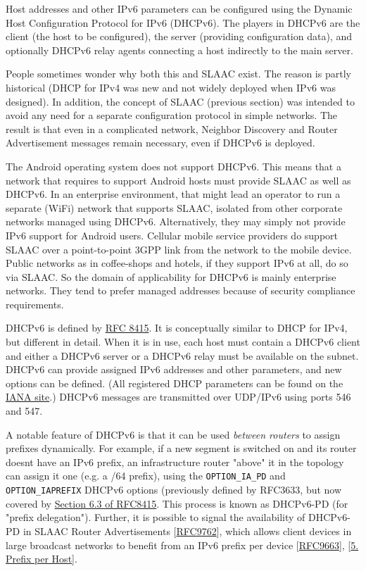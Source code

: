 \documentclass[
]{article}
\begin{document}
Host addresses and other IPv6 parameters can be configured using the
Dynamic Host Configuration Protocol for IPv6 (DHCPv6). The players in
DHCPv6 are the client (the host to be configured), the server (providing
configuration data), and optionally DHCPv6 relay agents connecting a
host indirectly to the main server.

People sometimes wonder why both this and SLAAC exist. The reason is
partly historical (DHCP for IPv4 was new and not widely deployed when
IPv6 was designed). In addition, the concept of SLAAC (previous section)
was intended to avoid any need for a separate configuration protocol in
simple networks. The result is that even in a complicated network,
Neighbor Discovery and Router Advertisement messages remain necessary,
even if DHCPv6 is deployed.

The Android operating system does not support DHCPv6. This means that a
network that requires to support Android hosts must provide SLAAC as
well as DHCPv6. In an enterprise environment, that might lead an
operator to run a separate (WiFi) network that supports SLAAC, isolated
from other corporate networks managed using DHCPv6. Alternatively, they
may simply not provide IPv6 support for Android users. Cellular mobile
service providers do support SLAAC over a point-to-point 3GPP link from
the network to the mobile device. Public networks as in coffee-shops and
hotels, if they support IPv6 at all, do so via SLAAC. So the domain of
applicability for DHCPv6 is mainly enterprise networks. They tend to
prefer managed addresses because of security compliance requirements.

DHCPv6 is defined by \href{https://www.rfc-editor.org/info/rfc8415}{RFC
8415}. It is conceptually similar to DHCP for IPv4, but different in
detail. When it is in use, each host must contain a DHCPv6 client and
either a DHCPv6 server or a DHCPv6 relay must be available on the
subnet. DHCPv6 can provide assigned IPv6 addresses and other parameters,
and new options can be defined. (All registered DHCP parameters can be
found on the
\href{https://www.iana.org/assignments/dhcpv6-parameters/dhcpv6-parameters.xhtml\#dhcpv6-parameters-2}{IANA
site}.) DHCPv6 messages are transmitted over UDP/IPv6 using ports 546
and 547.

A notable feature of DHCPv6 is that it can be used \emph{between
routers} to assign prefixes dynamically. For example, if a new segment
is switched on and its router doesn\textquotesingle t have an IPv6
prefix, an infrastructure router "above" it in the topology can assign
it one (e.g. a /64 prefix), using the \texttt{OPTION\_IA\_PD} and
\texttt{OPTION\_IAPREFIX} DHCPv6 options (previously defined by RFC3633,
but now covered by
\href{https://www.rfc-editor.org/rfc/rfc8415.html\#section-6.3}{Section
6.3 of RFC8415}. This process is known as DHCPv6-PD (for "prefix
delegation"). Further, it is possible to signal the availability of
DHCPv6-PD in SLAAC Router Advertisements
{[}\href{https://www.rfc-editor.org/info/rfc9762}{RFC9762}{]}, which
allows client devices in large broadcast networks to benefit from an
IPv6 prefix per device
{[}\href{https://www.rfc-editor.org/info/rfc9663}{RFC9663}{]},
{[}\hyperref[prefix-per-host]{5. Prefix per Host}{]}.
\end{document}
